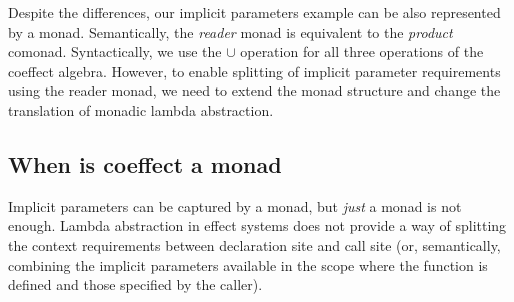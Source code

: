 \noindent
Despite the differences, our implicit parameters example can be also represented by a monad.
Semantically, the \emph{reader} monad is equivalent to the \emph{product} comonad. Syntactically,
we use the $\cup$ operation for all three operations of the coeffect algebra. However, to enable
splitting of implicit parameter requirements using the reader monad, we need to extend the 
monad structure and change the translation of monadic lambda abstraction.


\subsection{When is coeffect a monad}
\label{sec:semantics-related-monads}

Implicit parameters can be captured by a monad, but \emph{just} a monad is not enough.
Lambda abstraction in effect systems does not provide a way of splitting the context
requirements between declaration site and call site (or, semantically, combining the implicit 
parameters available in the scope where the function is defined and those specified by the caller).

